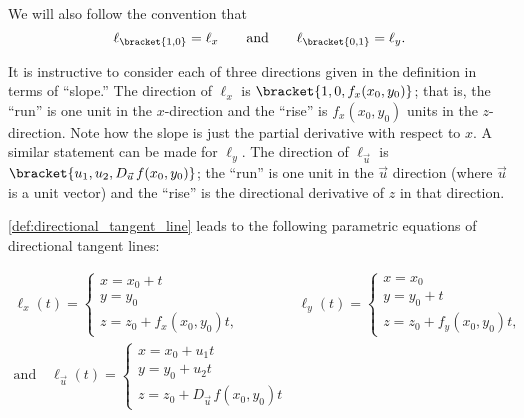 We will also follow the convention that\vspace{-.5\baselineskip}
\[
\ell_{\bracket{1,0}}=\ell_x
\qquad\text{and}\qquad
\ell_{\bracket{0,1}}=\ell_y.\vspace{-.5\baselineskip}
\]

It is instructive to consider each of three directions given in the definition in terms of ``slope.'' The direction of $\ell_x$ is $\bracket{1,0,f_x(x_0,y_0)}$; that is, the ``run'' is one unit in the $x$-direction and the ``rise'' is $f_x(x_0,y_0)$ units in the $z$-direction. Note how the slope is just the partial derivative with respect to $x$. A similar statement can be made for $\ell_y$. The direction of $\ell_{\vec u}$ is $\bracket{u_1,u_2,D_{\vec u\,}f(x_0,y_0)}$; the ``run'' is one unit in the $\vec u$ direction (where $\vec u$ is a unit vector) and the ``rise'' is the directional derivative of $z$ in that direction.


\autoref{def:directional_tangent_line} leads to the following parametric equations of directional tangent lines:

\begin{gather*}
 \ell_x(t)
 =\begin{cases}x=x_0+t \\ y=y_0\\z=z_0+f_x(x_0,y_0)t, \end{cases}\qquad\qquad
 \ell_y(t)
 =\begin{cases}x=x_0 \\ y=y_0+t\\z=z_0+f_y(x_0,y_0)t, \end{cases}\\
 \text{and}\quad
 \ell_{\vec u}(t)
 =\begin{cases}x=x_0+u_1t \\ y=y_0+u_2t\\z=z_0+D_{\vec u\,}f(x_0,y_0)t\end{cases}
\end{gather*}

